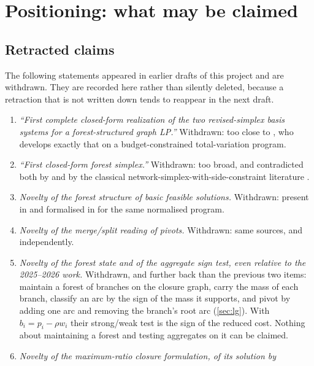 \section{Positioning: what may be claimed}\label{sec:positioning}

\subsection{Retracted claims}\label{sec:retracted}

The following statements appeared in earlier drafts of this project and are
withdrawn. They are recorded here rather than silently deleted, because a
retraction that is not written down tends to reappear in the next draft.

\begin{enumerate}[label=R\arabic*.,leftmargin=*]
\item \emph{``First complete closed-form realization of the two revised-simplex
      basis systems for a forest-structured graph LP.''} Withdrawn: too close to
      \citet{Yang2026}, who develops exactly that on a budget-constrained
      total-variation program.
\item \emph{``First closed-form forest simplex.''} Withdrawn: too broad, and
      contradicted both by \citet{Yang2026} and by the classical
      network-simplex-with-side-constraint literature
      \citep{AhujaEtAl1993,Schrijver2003}.
\item \emph{Novelty of the forest structure of basic feasible solutions.}
      Withdrawn: present in \citet{Wuille2025} and formalised in
      \citet{MollakhaniEtAl2026} for the same normalised program.
\item \emph{Novelty of the merge/split reading of pivots.} Withdrawn: same
      sources, and \citet{Yang2026} independently.
\item \emph{Novelty of the forest state and of the aggregate sign test, even
      relative to the 2025--2026 work.} Withdrawn, and further back than the
      previous two items: \citet{LerchsGrossmann1965} maintain a forest of
      branches on the closure graph, carry the mass of each branch, classify an
      arc by the sign of the mass it supports, and pivot by adding one arc and
      removing the branch's root arc (\cref{sec:lg}). With $b_i = p_i - \rho
      w_i$ their strong/weak test is the sign of the \FS{} reduced cost. Nothing
      about maintaining a forest and testing aggregates on it can be claimed.
\item \emph{Novelty of the maximum-ratio closure formulation, of its solution by
}
\end{enumerate}
